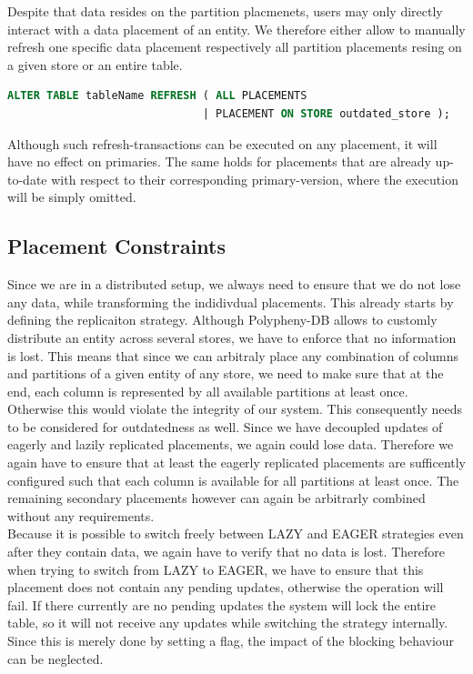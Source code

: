Despite that data resides on the partition placmenets, users may only directly interact with a data placement of an entity.
We therefore either allow to manually refresh one specific data placement respectively all partition placements resing on a given store or an entire table.

\begin{lstlisting}[language=sql, caption={SQL Statement Syntax for an On-Demand Refresh Operation}]
ALTER TABLE tableName REFRESH ( ALL PLACEMENTS 
                              | PLACEMENT ON STORE outdated_store );
\end{lstlisting}

Although such refresh-transactions can be executed on any placement, it will have no effect on primaries. 
The same holds for placements that are already up-to-date with respect to their corresponding primary-version, where the execution will be simply omitted.





\subsection{Placement Constraints}
\label{sec:constraints}

Since we are in a distributed setup, we always need to ensure that we do not lose any data, while transforming the indidivdual placements. 
This already starts by defining the replicaiton strategy. Although Polypheny-DB allows to customly distribute an entity across several stores, we have to enforce that no 
information is lost. This means that since we can arbitraly place any combination of columns and partitions of a given entity of any store, we need to make sure that at the end, 
each column is represented by all available partitions at least once. Otherwise this would violate the integrity of our system. 
This consequently needs to be considered for outdatedness as well. Since we have decoupled updates of eagerly and lazily replicated placements, we again could lose data. 
Therefore we again have to ensure that at least the eagerly replicated placements are sufficently configured such that each column is available for all partitions at least once.
The remaining secondary placements however can again be arbitrarly combined without any requirements.\\
Because it is possible to switch freely between LAZY and EAGER strategies even after they contain data, we again have to verify that no data is lost.
Therefore when trying to switch from LAZY to EAGER, we have to ensure that this placement does not contain any pending updates, otherwise the operation will fail.
If there currently are no pending updates the system will lock the entire table, so it will not receive any updates while switching the strategy internally. 
Since this is merely done by setting a flag, the impact of the blocking behaviour can be neglected.\\

